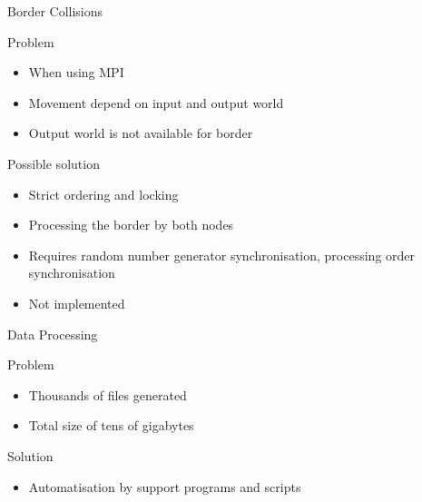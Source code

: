 \documentclass{beamer}
\begin{document}
\begin{frame}{Border Collisions}
    \begin{block}{Problem}
        \begin{itemize}
            \item When using MPI
            \item Movement depend on input and output world
            \item Output world is not available for border
        \end{itemize}
    \end{block}
    \begin{block}{Possible solution}
        \begin{itemize}
            \item Strict ordering and locking
            \item Processing the border by both nodes
            \item Requires random number generator synchronisation, processing order synchronisation
            \item Not implemented
        \end{itemize} 
    \end{block}
\end{frame}

\begin{frame}{Data Processing}
    \begin{block}{Problem}
        \begin{itemize}
            \item Thousands of files generated
            \item Total size of tens of gigabytes
        \end{itemize}
    \end{block}
    \begin{block}{Solution}
        \begin{itemize}
            \item Automatisation by support programs and scripts
        \end{itemize}
    \end{block}
\end{frame}
\end{document}
